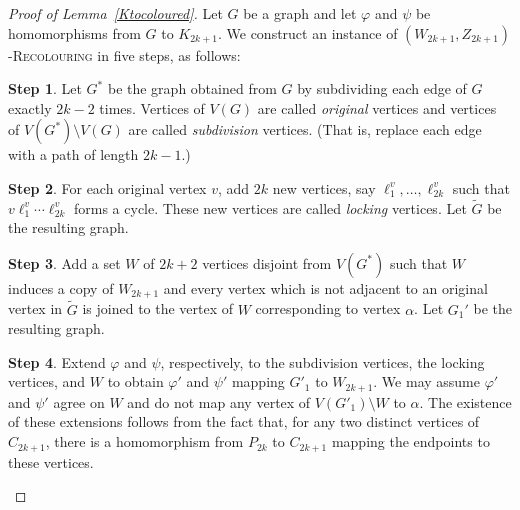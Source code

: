 \documentclass[11 pt]{amsart}
\theoremstyle{definition}
\theoremstyle{case}
\newtheorem{step}{Step}
\numberwithin{equation}{section}
\newcommand\Hrec[1]{\textsc{$#1$-Recolouring}}
\begin{document}
\begin{proof}[Proof of Lemma~\ref{Ktocoloured}]
Let $G$ be a graph and let $\varphi$ and $\psi$ be homomorphisms from $G$ to $K_{2k+1}$. We construct an instance of \Hrec{(W_{2k+1},Z_{2k+1})} in five steps, as follows:

\begin{step}
Let $G^*$ be the graph obtained from $G$ by subdividing each edge of $G$ exactly $2k-2$ times. Vertices of $V(G)$ are called \emph{original} vertices and vertices of $V(G^*)\setminus V(G)$ are called \emph{subdivision} vertices.  (That is, replace each edge with a path of length $2k-1$.)
\end{step}

\begin{step}
\label{lock}
For each original vertex $v$, add $2k$ new vertices, say $\ell_1^v,\dots,\ell_{2k}^v$ such that $v\ell_1^v\cdots \ell_{2k}^v$ forms a cycle. These new vertices are called \emph{locking} vertices. Let $\tilde{G}$ be the resulting graph. 
\end{step}

\begin{step}
\label{Wstep}
Add a set $W$ of $2k+2$ vertices disjoint from $V(G^*)$ such that $W$ induces a copy of $W_{2k+1}$ and every vertex which is not adjacent to an original vertex in $\tilde{G}$ is joined to the vertex of $W$ corresponding to vertex $\alpha$. Let $G_1'$ be the resulting graph.
\end{step}

\begin{step}
Extend $\varphi$ and $\psi$, respectively, to the subdivision vertices, the locking vertices, and $W$ to obtain $\varphi'$ and $\psi'$ mapping $G'_1$ to $W_{2k+1}$.  We may assume $\varphi'$ and $\psi'$ agree on $W$ and do not map any vertex of $V(G'_1)\setminus W$ to $\alpha$. The existence of these extensions follows from the fact that, for any two distinct vertices of $C_{2k+1}$, there is a homomorphism from $P_{2k}$ to $C_{2k+1}$ mapping the endpoints to these vertices.
\end{step}


\end{proof}
\end{document}
